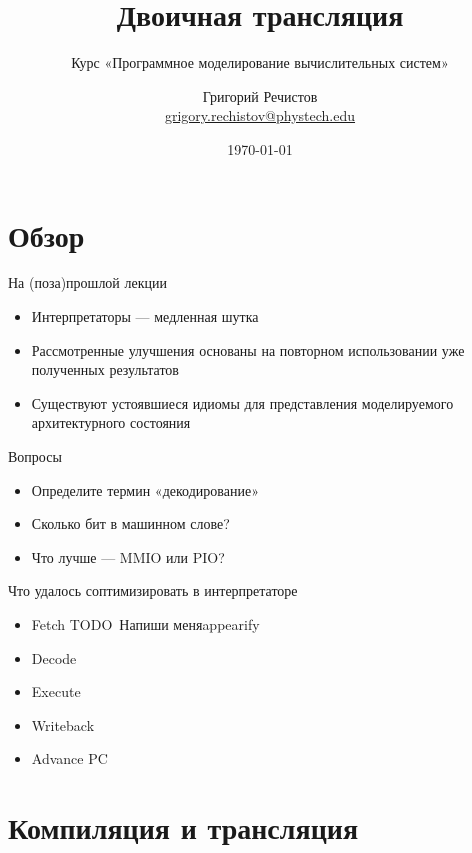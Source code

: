 \documentclass{beamer}
\title{Двоичная трансляция}
\subtitle{Курс «Программное моделирование вычислительных систем»}
\author[]{Григорий Речистов \\ \small{\href{mailto:grigory.rechistov@phystech.edu}{grigory.rechistov@phystech.edu}}}
\date{\today}
\newcommand{\todo}[1][Напиши меня]{{\color{red}TODO\ #1}}
\begin{document}
\begin{frame}
    \maketitle
\end{frame}

\begin{frame}
    \tableofcontents
\end{frame}

\section*{Обзор}

\begin{frame}{На (поза)прошлой лекции}
\begin{itemize}
\item Интерпретаторы — медленная шутка
\item Рассмотренные улучшения основаны на повторном использовании уже полученных результатов
\item Существуют устоявшиеся идиомы для представления моделируемого архитектурного состояния
\end{itemize}
\end{frame}

\begin{frame}{Вопросы}
\begin{itemize}
\item Определите термин «декодирование» \pause
\item Сколько бит в машинном слове? \pause
\item Что лучше — MMIO или PIO?
\end{itemize}

\end{frame}


\begin{frame}{Что удалось соптимизировать в интерпретаторе}
\begin{itemize}
\item Fetch \todo{appearify}
\item Decode
\item Execute
\item Writeback
\item Advance PC
\end{itemize}
\end{frame}

\section{Компиляция и трансляция}
\end{document}
